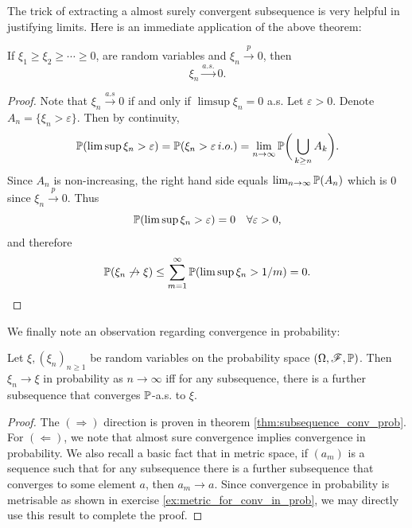The trick of extracting a almost surely convergent subsequence is very helpful in justifying limits. Here is an immediate application of the above theorem:
\begin{corollary}
If $\xi_1 \ge \xi_2 \ge \cdots \ge 0$, are random variables and $\xi_n \xrightarrow{p} 0$, then
\begin{equation*}
    \xi_n \xrightarrow{a.s.} 0.
\end{equation*}
\end{corollary}

\begin{proof}
Note that $\xi_n \xrightarrow{a.s} 0 $ if and only if $\limsup \xi_n = 0$ a.s. Let $\varepsilon > 0$. Denote $A_n = \{\xi_n > \varepsilon \}$. Then by continuity,
\begin{equation*}
    \mathbb{P}(\limsup \xi_n > \varepsilon) = \mathbb{P}(\xi_n > \varepsilon \, i.o.) = \lim_{n \to \infty} \mathbb{P}\bigg(\bigcup_{k \ge n} A_k\bigg).
\end{equation*}
Since $A_n$ is non-increasing, the right hand side equals $\lim_{n \to \infty} \mathbb{P}(A_n)$ which is $0$ since $\xi_n \xrightarrow{p} 0$. Thus 
\begin{equation*}
    \mathbb{P}(\limsup \xi_n > \varepsilon) = 0 \quad \forall \varepsilon > 0,
\end{equation*}
and therefore
\begin{equation*}
    \mathbb{P}(\xi_n \not \to \xi) \le \sum_{m=1}^\infty \mathbb{P}(\limsup \xi_n > 1/m) = 0.
\end{equation*}
\end{proof}

\begin{unexaminable}
We finally note an observation regarding convergence in probability:
\begin{corollary}
Let $\xi, (\xi_n)_{n\geq 1}$ be random variables on the probability space $(\Omega,\mathcal{F},\mathbb{P})$. Then $\xi_n \to \xi$ in probability as $n \to \infty$ iff for any subsequence, there is a further subsequence that converges $\mathbb{P}$-a.s. to $\xi$.
\end{corollary}
\begin{proof}
The $(\Rightarrow)$ direction is proven in theorem \ref{thm:subsequence_conv_prob}. For $(\Leftarrow)$, we note that almost sure convergence implies convergence in probability. We also recall a basic fact that in metric space, if $(a_m)$ is a sequence such that for any subsequence there is a further subsequence that converges to some element $a$, then $a_m \to a$. Since convergence in probability is metrisable as shown in exercise \ref{ex:metric_for_conv_in_prob}, we may directly use this result to complete the proof.
\end{proof}
\end{unexaminable}

